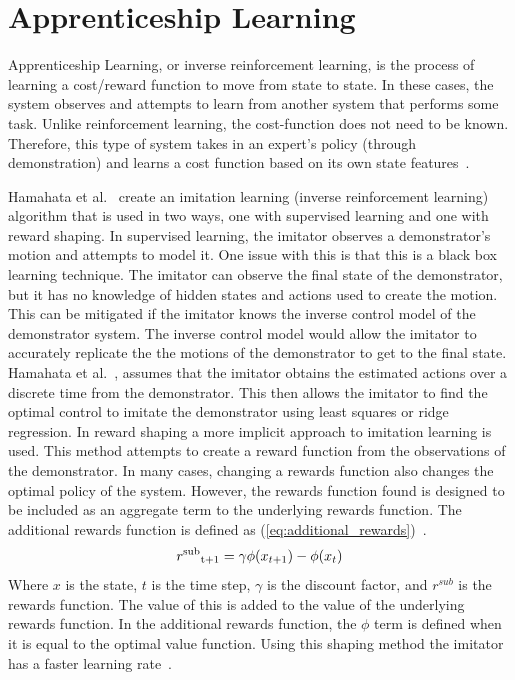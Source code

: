 \documentclass[12pt,american]{report}
\begin{document}
\section{Apprenticeship Learning}
	Apprenticeship Learning, or inverse reinforcement learning, is the process of learning a cost/reward function to move from state to state. In these cases, the system observes and attempts to learn from another system that performs some task. Unlike reinforcement learning, the cost-function does not need to be known. Therefore, this type of system takes in an expert's policy (through demonstration) and learns a cost function based on its own state features~\cite{jangir_2016}.		
		
		Hamahata et al.~\cite{hamahata2008effective} create an imitation learning (inverse reinforcement learning) algorithm that is used in two ways, one with supervised learning and one with reward shaping. In supervised learning, the imitator observes a demonstrator's motion and attempts to model it. One issue with this is that this is a black box learning technique.  The imitator can observe the final state of the demonstrator, but it has no knowledge of hidden states and actions used to create the motion. This can be mitigated if the imitator knows the inverse control model of the demonstrator system. The inverse control model would allow the imitator to accurately replicate the the motions of the demonstrator to get to the final state. Hamahata et al.~\cite{hamahata2008effective}, assumes that the imitator obtains the estimated actions over a discrete time from the demonstrator.  This then allows the imitator to find the optimal control to imitate the demonstrator using least squares or ridge regression. In reward shaping a more implicit approach to imitation learning is used. This method attempts to create a reward function from the observations of the demonstrator.  In many cases, changing a rewards function also changes the optimal policy of the system.  However, the rewards function found is designed to be included as an aggregate term to the underlying rewards function. The additional rewards function is defined as (\ref{eq:additional_rewards})~\cite{hamahata2008effective}.
		\begin{equation}
            \label{eq:additional_rewards}
            r\textsuperscript{sub}\textsubscript{t+1}= \gamma\phi(x_{t+1})-\phi(x_{t})
        \end{equation}
		Where $x$ is the state, $t$ is the time step, $\gamma$ is the discount factor, and $r^{sub}$ is the rewards function. The value of this is added to the value of the underlying rewards function. In the additional rewards function, the \textit{$\phi$} term is defined when it is equal to the optimal value function. Using this shaping method the imitator has a faster learning rate~\cite{hamahata2008effective}.
		
\end{document}
